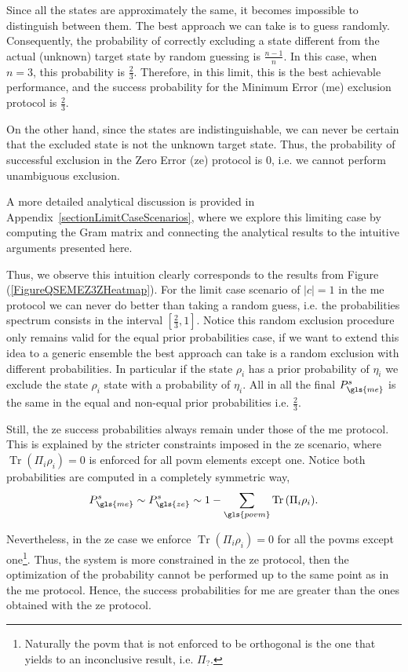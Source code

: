 \documentclass[12pt,letterpaper]{article}
\DeclareMathOperator{\tr}{Tr}
\begin{document}
Since all the states are approximately the same, it becomes impossible to distinguish between them. The best approach we can take is to guess randomly. Consequently, the probability of correctly excluding a state different from the actual (unknown) target state by random guessing is $\frac{n - 1}{n}$. In this case, when $n = 3$, this probability is $\frac{2}{3}$. Therefore, in this limit, this is the best achievable performance, and the success probability for the Minimum Error (\gls{me}) exclusion protocol is $\frac{2}{3}$.

On the other hand, since the states are indistinguishable, we can never be certain that the excluded state is not the unknown target state. Thus, the probability of successful exclusion in the Zero Error (\gls{ze}) protocol is $0$, i.e. we cannot perform unambiguous exclusion.

A more detailed analytical discussion is provided in Appendix~\ref{sectionLimitCaseScenarios}, where we explore this limiting case by computing the Gram matrix and connecting the analytical results to the intuitive arguments presented here. 

Thus, we observe this intuition clearly corresponds to the results from Figure (\ref{FigureQSEMEZ3ZHeatmap}). For the limit case scenario of $|c|=1$ in the \gls{me} protocol we can never do better than taking a random guess, i.e. the probabilities spectrum consists in the interval $[\frac{2}{3},1]$. Notice this random exclusion procedure only remains valid for the equal prior probabilities case, if we want to extend this idea to a generic ensemble the best approach can take is a random exclusion with different probabilities. In particular if the state $\rho_i$ has a prior probability of $\eta_i$ we exclude the state $\rho_i$ state with a probability of $\eta_i$. All in all the final $P_{\gls{me}}^s$ is the same in the equal and non-equal prior probabilities i.e. $\frac{2}{3}$.

Still, the \gls{ze} success probabilities always remain under those of the \gls{me} protocol. This is explained by the stricter constraints imposed in the \gls{ze} scenario, where $\tr(\Pi_i\rho_i) = 0$ is enforced for all \gls{povm} elements except one. Notice both probabilities are computed in a completely symmetric way,
\begin{align*}
	P^s_{\gls{me}}\sim P^s_{\gls{ze}}\sim 1-\sum_{\gls{povm}}\tr{(\Pi_i\rho_i)}.
\end{align*}

Nevertheless, in the \gls{ze} case we enforce $\tr{(\Pi_i\rho_i)}=0$ for all the \glspl{povm} except one\footnote{Naturally the \gls{povm} that is not enforced to be orthogonal is the one that yields to an inconclusive result, i.e. $\Pi_?$.}. Thus, the system is more constrained in the \gls{ze} protocol, then the optimization of the probability cannot be performed up to the same point as in the \gls{me} protocol. Hence, the success probabilities for \gls{me} are greater than the ones obtained with the \gls{ze} protocol.
\end{document}
